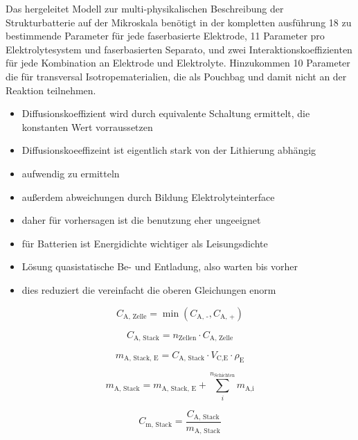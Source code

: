 Das hergeleitet Modell zur multi-physikalischen Beschreibung der Strukturbatterie auf der Mikroskala benötigt in der kompletten ausführung 18 zu bestimmende Parameter für jede faserbasierte Elektrode, 11 Parameter pro Elektrolytesystem und faserbasierten Separato, und zwei Interaktionskoeffizienten für jede Kombination an Elektrode und Elektrolyte. Hinzukommen 10 Parameter die für transversal Isotropematerialien, die als Pouchbag und damit nicht an der Reaktion teilnehmen.


\begin{itemize}
    \item Diffusionskoeffizient wird durch equivalente Schaltung ermittelt, die konstanten Wert vorraussetzen
    \item Diffusionskoeeffizeint ist eigentlich stark von der Lithierung abhängig
    \item aufwendig zu ermitteln
    \item außerdem abweichungen durch Bildung Elektrolyteinterface
    \item daher für vorhersagen ist die benutzung eher ungeeignet
    \item für Batterien ist Energidichte wichtiger als Leisungsdichte
    \item Lösung quasistatische Be- und Entladung, also warten bis vorher
    \item dies reduziert die vereinfacht die oberen Gleichungen enorm
\end{itemize}

\begin{equation}
    C_{\text{A, Zelle}} = \min \left( C_{\text{A, -}} , C_{\text{A, +}}\right)
\end{equation}

\begin{equation}
    C_{\text{A, Stack}} = n_{\text{Zellen}} \cdot C_{\text{A, Zelle}}
\end{equation}

\begin{equation}
    m_{\text{A, Stack, E}} = C_{\text{A, Stack}} \cdot V_{\text{C,E}} \cdot \rho_{\text{E}}
\end{equation}

\begin{equation}
    m_{\text{A, Stack}} = m_{\text{A, Stack, E}} + \sum_{i}^{n_{\text{Schichten}}} m_{\text{A,i}} 
\end{equation}

\begin{equation}
    C_{\text{m, Stack}} = \frac{C_{\text{A, Stack}} }{ m_{\text{A, Stack}}}
\end{equation}

